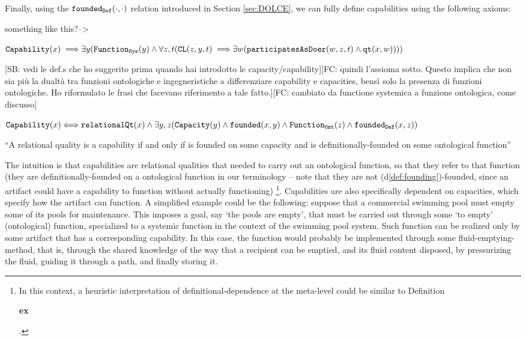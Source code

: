 \documentclass[sw]{iosart2x}
\newcommand{\bflist}{\begin{list}{}{\setlength{\topsep}{2mm}\setlength{\partopsep}{0mm}\setlength{\parsep}{0mm}\setlength{\leftmargin}{9mm}\setlength{\labelwidth}{8mm}}}
\newcommand{\eflist}{\end{list}}
\newcommand{\AxLabel}{\textrm{a}}
\newcommand{\DefLabel}{\textrm{d}}
\newcommand{\ExLabel}{\textrm{ex}}
\newcounter{cntax}
\newcommand{\myax}[1]{\refstepcounter{cntax}\begin{small}{\bf \AxLabel\thecntax\label{ax:#1}}\end{small}}
\newcounter{cntdef}
\newcommand{\mydf}[1]{\refstepcounter{cntdef}\begin{small}{\bf \DefLabel\thecntdef\label{def:#1}}\end{small}}
\newcommand{\myex}[1]{\refstepcounter{cntex}\begin{small}{\bf \ExLabel\thecntex\label{ex:#1}}\end{small}}
\newcounter{cntex}
\newcommand{\mytext}[1]{``#1''}
\newcommand{\refdf}[1]{({\DefLabel}\ref{#1})}
\newcommand{\generalStyle}[1]{\texttt{#1}}
\newcommand{\biRel}[3]{\generalStyle{#1}(#2,#3)}
\newcommand{\uniRel}[2]{\generalStyle{#1}(#2)}
\newcommand{\uniRelPar}[3]{\generalStyle{#1}_{\generalStyle{#3}}(#2)}
\newcommand{\biRelPar}[4]{\generalStyle{#1}_{\generalStyle{#4}}(#2,#3)}
\newcommand{\triRel}[4]{\generalStyle{#1}(#2,#3,#4)}
\newcommand{\myiff}{\Longleftrightarrow}
\newcommand{\myfi}{\hspace{0.9mm} \Longrightarrow}
\newcommand{\DOLCEQualityDirect}[2]{\biRel{qt}{#1}{#2}}
\newcommand{\DOLCECLby}[3]{\triRel{CL}{#1}{#2}{#3}}
\newcommand{\Capability}[1]{\uniRel{Capability}{#1}}
\newcommand{\Capacity}[1]{\uniRel{Capacity}{#1}}
\newcommand{\RelationalQuality}[1]{\uniRel{relationalQt}{#1}}
\newcommand{\FunctionSys}[1]{\uniRelPar{Function}{#1}{Sys}}
\newcommand{\FunctionAbs}[1]{\uniRelPar{Function}{#1}{Ont}}
\newcommand{\founded}[2]{\biRel{\foundedTerm{passive}}{#1}{#2}}
\newcommand{\participateAsDoer}[3]{\triRel{participatesAsDoer}{#1}{#2}{#3}}
\newcommand{\foundedDef}[2]{\biRelPar{\foundedTerm{passive}}{#1}{#2}{Def}}
\newcommand{\foundedTerm}[1]{%
  \ifthenelse{\equal{#1}{passive}}{founded}{%
    \ifthenelse{\equal{#1}{verb}}{found}{%
      \ifthenelse{\equal{#1}{gerund}}{founding}{%
        ERROR!%
      }%
    }%
  }%
}
\newcommand{\TODO}[1]{{\color{red} #1}}
\newcommand{\myComment}[1]{}
\begin{document}
Finally, using the $\foundedDef{\cdot}{\cdot}$ relation introduced in Section \ref{sec:DOLCE}, we can fully define capabilities using the following axioms:
\TODO{something like this?-->
\bflist
  \item[\myax{capabilityCostrTris}] $ \Capability{x} \myfi \exists y (\FunctionSys{y} \land \forall z,t(\DOLCECLby{z}{y}{t} \myfi \exists w(\participateAsDoer{w}{z}{t} \land \DOLCEQualityDirect{x}{w})))$
\eflist
}
\TODO{[SB: vedi le def.s che ho suggerito prima quando hai introdotto le capacity/capability][FC: quindi l'assioma sotto. Questo implica che non sia più la dualtà tra funzioni ontologiche e ingegneristiche a differenziare capability e capacities, bensì solo la presenza di funzioni ontologiche. Ho riformulato le frasi che facevano riferimento a tale fatto.][FC: cambiato da functione systemica  a funzione ontologica, come discusso]}
\bflist
\item[\mydf{capability}] $ \Capability{x} \myiff  \RelationalQuality{x} \land \exists y,z(\Capacity{y} \land \founded{x}{y} \land \FunctionAbs{z} \land \foundedDef{x}{z}) $  
\item[] \mytext{A relational quality is a capability if and only if is founded on some capacity and is definitionally-founded on some ontological function}
\eflist
The intuition is that capabilities are relational qualities that needed to carry out an ontological function, so that they refer to that function (they are definitionally-founded on a ontological function in our terminology -- note that they are not \refdf{def:founding}-founded, since an artifact could have a capability to function without actually functioning) 
\footnote{In this context, a heuristic interpretation of definitional-dependence at the meta-level could be similar to Definition \myex{ex:Capab}.}.
Capabilities are also specifically dependent on capacities, which specify how the artifact can function.  
A simplified example could be the following\myComment{\footnote{Notice again the similarity with the work of Kitamura, Sasajima, Mizoguchi \& al.\cite{kitamuraOntologybasedDescriptionFunctional2003}.}}: suppose that a commercial swimming pool must empty some of its pools for maintenance. This imposes a goal, say `the pools are empty', that must be carried out through some `to empty' (ontological) function, specialized to a systemic function in the context of the swimming pool system. Such function can be realized only by some artifact that has a corresponding capability. In this case, the function would probably be implemented through some fluid-emptying-method, that is, through the shared knowledge of the way that a recipient can be emptied, and its fluid content disposed, by pressurizing the fluid, guiding it through a path, and finally storing it.
\end{document}
